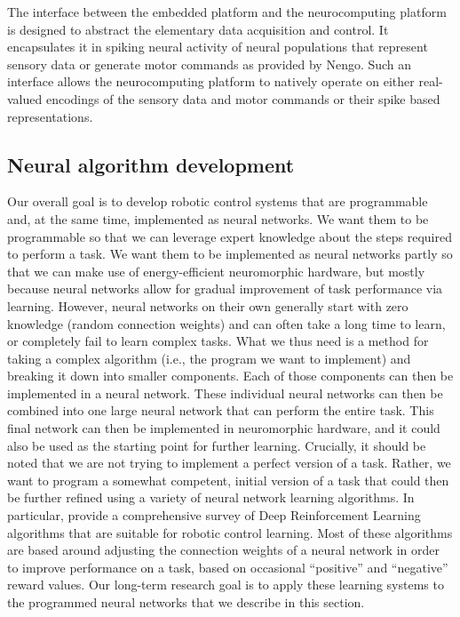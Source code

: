 The interface between the embedded platform and the neurocomputing platform is designed to abstract the elementary data acquisition and control. 
It encapsulates it in spiking neural activity of neural populations that represent sensory data or generate motor commands as provided by \ac{Nengo}. 
Such an interface allows the neurocomputing platform to natively operate on either real-valued encodings of the sensory data and motor commands or their spike based representations.

\subsection{Neural algorithm development}%
\label{subsec:neural_algorithm_development}

Our overall goal is to develop robotic control systems that are programmable and, at the same time, implemented as neural networks. 
We want them to be programmable so that we can leverage expert knowledge about the steps required to perform a task. 
We want them to be implemented as neural networks partly so that we can make use of energy-efficient neuromorphic hardware, but mostly because neural networks allow for gradual improvement of task performance via learning. 
However, neural networks on their own generally start with zero knowledge (random connection weights) and can often take a long time to learn, or completely fail to learn complex tasks.
What we thus need is a method for taking a complex algorithm (i.e., the program we want to implement) and breaking it down into smaller components. 
Each of those components can then be implemented in a neural network. 
These individual neural networks can then be combined into one large neural network that can perform the entire task. 
This final network can then be implemented in neuromorphic hardware, and it could also be used as the starting point for further learning.
Crucially, it should be noted that we are not trying to implement a perfect version of a task. 
Rather, we want to program a somewhat competent, initial version of a task that could then be further refined using a variety of neural network learning algorithms. 
In particular, \textcite{Duan2016} provide a comprehensive survey of Deep Reinforcement Learning algorithms that are suitable for robotic control learning. 
Most of these algorithms are based around adjusting the connection weights of a neural network in order to improve performance on a task, based on occasional “positive” and “negative” reward values. 
Our long-term research goal is to apply these learning systems to the programmed neural networks that we describe in this section.

